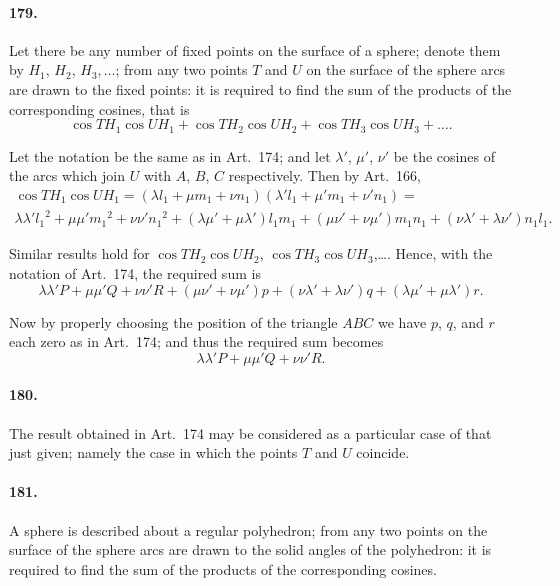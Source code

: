 \documentclass{book}[2004/02/16]
\begin{document}
\begin{mainmatter}
\begin{spacing}{1.3}
\paragraph{179.} Let there be any number of fixed points on the surface
of a sphere; denote them by $H_1$, $H_2$, $H_3,\dots$; from any two points
$T$ and $U$ on the surface of the sphere arcs are drawn to the fixed
points: it is required to find the sum of the products of the corresponding
cosines, that is
\[
\cos TH_1 \cos UH_1 + \cos TH_2 \cos UH_2 + \cos TH_3 \cos UH_3 + \dots.
\]

Let the notation be the same as in Art.\ 174; and let $\lambda'$, $\mu'$, $\nu'$
be the cosines of the arcs which join $U$ with $A$, $B$, $C$ respectively.
Then by Art.\ 166,
\begin{gather*}
\cos TH_1 \cos UH_1 = (\lambda l_1 + \mu m_1 + \nu n_1)(\lambda'l_1 + \mu'm_1 + \nu'n_1) =\\
\lambda\lambda'{l_1}^2 + \mu\mu'{m_1}^2 + \nu\nu'{n_1}^2 + (\lambda\mu' + \mu\lambda')l_1m_1 + (\mu\nu' + \nu\mu')m_1n_1 + (\nu\lambda' + \lambda\nu')n_1 l_1.
\end{gather*}

Similar results hold for $\cos TH_2 \cos UH_2$, $\cos TH_3 \cos UH_3$,\ldots.
Hence, with the notation of Art.~174, the required sum is
\[
\lambda\lambda'P + \mu\mu'Q + \nu\nu'R + (\mu\nu' + \nu\mu')p + (\nu\lambda' + \lambda\nu')q + (\lambda\mu' + \mu\lambda')r.
\]

Now by properly choosing the position of the triangle $ABC$
we have $p$, $q$, and $r$ each zero as in Art.~174; and thus the
required sum becomes
\[
\lambda\lambda'P + \mu\mu'Q + \nu\nu'R.
\]

\paragraph{180.} The result obtained in Art.~174 may be considered
as a particular case of that just given; namely the case in which
the points $T$ and $U$ coincide.

\paragraph{181.} A sphere is described about a regular polyhedron; from
any two points on the surface of the sphere arcs are drawn to
the solid angles of the polyhedron: it is required to find the sum
of the products of the corresponding cosines.


\end{spacing}
\end{mainmatter}
\end{document}
